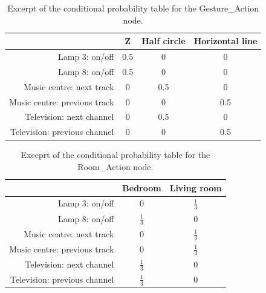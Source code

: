 \begin{table}[]
\centering
\caption{Excerpt of the conditional probability table for the Gesture\_Action node.}
\label{tbl:design:bayesian-network:cpt-gesture-action}
\begin{tabular}{r|ccc}
                             & Z   & Half circle & Horizontal line \\ \hline
Lamp 3: on/off               & 0.5 & 0             & 0                \\
Lamp 8: on/off               & 0.5 & 0             & 0                \\
Music centre: next track     & 0   & 0.5             & 0                \\
Music centre: previous track & 0   & 0             & 0.5              \\
Television: next channel     & 0   & 0.5             & 0                \\
Television: previous channel & 0   & 0             & 0.5              
\end{tabular}
\end{table}

\begin{table}[]
\centering
\caption{Exceprt of the conditional probability table for the Room\_Action node.}
\label{tbl:design:bayesian-network:cpt-room-action}
\begin{tabular}{r|cc}
                             & Bedroom & Living room \\ \hline
Lamp 3: on/off               & 0 & $\frac{1}{3}$ \\
Lamp 8: on/off               & $\frac{1}{3}$ & 0 \\
Music centre: next track     & 0   & $\frac{1}{3}$ \\
Music centre: previous track & 0    & $\frac{1}{3}$ \\
Television: next channel     & $\frac{1}{3}$   & 0  \\
Television: previous channel & $\frac{1}{3}$   & 0  \\
\end{tabular}
\end{table}

